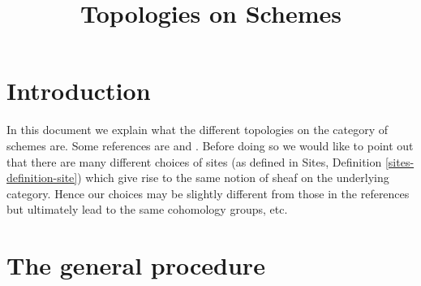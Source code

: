 

%


\title{Topologies on Schemes}

\maketitle

\tableofcontents



\section{Introduction}
\label{section-introduction}

\noindent
In this document we explain what the different topologies on the
category of schemes are. Some references are \cite{SGA1} and \cite{Ner}.
Before doing so we would like to point out that there are many
different choices of sites (as defined in
Sites, Definition \ref{sites-definition-site}) which give rise to
the same notion of sheaf on the underlying category. Hence
our choices may be slightly different from those in the references
but ultimately lead to the same cohomology groups, etc.

\section{The general procedure}
\label{section-procedure}

